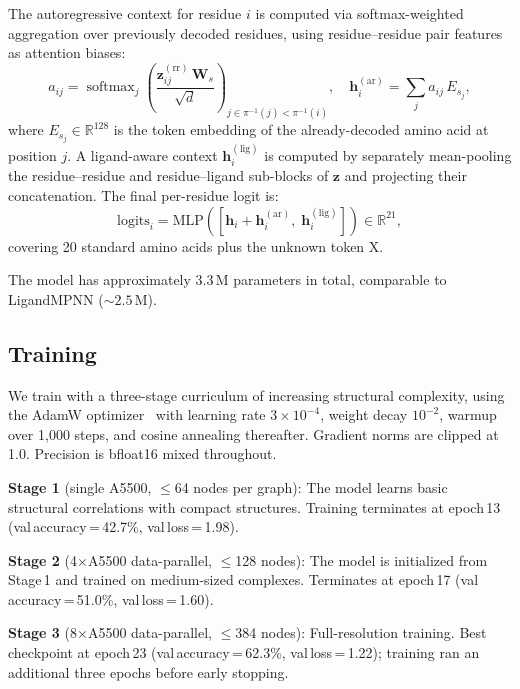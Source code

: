 \documentclass[11pt,letterpaper]{article}
\newcommand{\R}{\mathbb{R}}
\newcommand{\bz}{\mathbf{z}}
\newcommand{\bh}{\mathbf{h}}
\newcommand{\bW}{\mathbf{W}}
\DeclareMathOperator*{\softmax}{softmax}
\begin{document}
The autoregressive context for residue $i$ is computed via softmax-weighted aggregation over
previously decoded residues, using residue--residue pair features as attention biases:
\begin{equation}
  a_{ij} = \softmax_j\!\left(\frac{\bz_{ij}^{(\text{rr})}\,\bW_s}{\sqrt{d}}\right)_{j \in \pi^{-1}(j) < \pi^{-1}(i)},
  \quad \bh_i^{(\text{ar})} = \sum_j a_{ij}\,E_{s_j},
\end{equation}
where $E_{s_j} \in \R^{128}$ is the token embedding of the already-decoded amino acid at
position $j$. A ligand-aware context $\bh_i^{(\text{lig})}$ is computed by separately mean-pooling
the residue--residue and residue--ligand sub-blocks of $\bz$ and projecting their concatenation.
The final per-residue logit is:
\begin{equation}
  \text{logits}_i = \text{MLP}\!\left([\bh_i + \bh_i^{(\text{ar})}, \;\bh_i^{(\text{lig})}]\right) \in \R^{21},
\end{equation}
covering 20 standard amino acids plus the unknown token X.

The model has approximately 3.3\,M parameters in total, comparable to LigandMPNN (${\sim}2.5$\,M).

\subsection{Training}
\label{sec:training}

We train with a three-stage curriculum of increasing structural complexity, using the AdamW
optimizer~\citep{loshchilov2019decoupled} with learning rate $3{\times}10^{-4}$, weight decay
$10^{-2}$, warmup over 1{,}000 steps, and cosine annealing thereafter. Gradient norms are clipped
at 1.0. Precision is bfloat16 mixed throughout.

\textbf{Stage 1} (single A5500, $\leq$64 nodes per graph): The model learns basic structural
correlations with compact structures. Training terminates at epoch\,13 (val\,accuracy\,=\,42.7\%,
val\,loss\,=\,1.98).

\textbf{Stage 2} (4$\times$A5500 data-parallel, $\leq$128 nodes): The model is initialized from
Stage\,1 and trained on medium-sized complexes. Terminates at epoch\,17
(val\,accuracy\,=\,51.0\%, val\,loss\,=\,1.60).

\textbf{Stage 3} (8$\times$A5500 data-parallel, $\leq$384 nodes): Full-resolution training.
Best checkpoint at epoch\,23 (val\,accuracy\,=\,62.3\%, val\,loss\,=\,1.22); training ran an
additional three epochs before early stopping.
\end{document}
